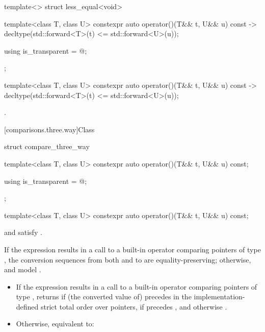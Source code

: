 %
\begin{itemdecl}
template<> struct less_equal<void> {
  template<class T, class U> constexpr auto operator()(T&& t, U&& u) const
    -> decltype(std::forward<T>(t) <= std::forward<U>(u));

  using is_transparent = @\unspec@;
};
\end{itemdecl}

%
\begin{itemdecl}
template<class T, class U> constexpr auto operator()(T&& t, U&& u) const
    -> decltype(std::forward<T>(t) <= std::forward<U>(u));
\end{itemdecl}

\begin{itemdescr}
\pnum
\returns
{}.
\end{itemdescr}

[comparisons.three.way]{Class }

%
\begin{codeblock}
struct compare_three_way {
  template<class T, class U>
    constexpr auto operator()(T&& t, U&& u) const;

  using is_transparent = @\unspec@;
};
\end{codeblock}

\begin{itemdecl}
template<class T, class U>
  constexpr auto operator()(T&& t, U&& u) const;
\end{itemdecl}

\begin{itemdescr}
\pnum
\constraints
{} and  satisfy .

\pnum
\expects
If the expression  results in
a call to a built-in operator \tcode{<=>} comparing pointers of type ,
the conversion sequences from both  and  to 
are equality-preserving;
otherwise,  and  model .

\pnum
\effects
\begin{itemize}
\item
  If the expression  results in
  a call to a built-in operator \tcode{<=>} comparing pointers of type ,
  returns 
  if (the converted value of)  precedes 
  in the implementation-defined strict total order
  over pointers,
  if  precedes , and
  otherwise .
\item
  Otherwise, equivalent to: 
\end{itemize}
\end{itemdescr}

